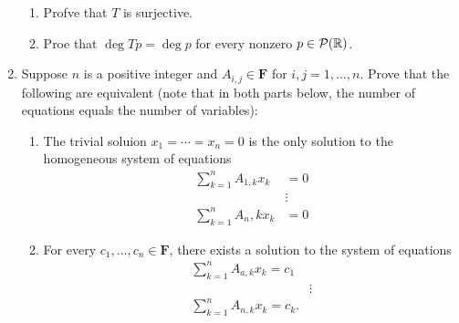 \documentclass[10pt,a4paper]{report}
\newcommand{\F}{\textbf{F}}
\begin{document}
\begin{enumerate}
\begin{enumerate}
	\item Profve that $T$ is surjective.
	\item Proe that $\deg Tp = \deg p$ for every nonzero $p \in \mathcal{P}(\mathbb{R})$.
\end{enumerate}

\item Suppose $n$ is a positive integer and $A_{i,j} \in \F$ for $i,j = 1,\dots,n$.  Prove that the following are equivalent (note that in both parts below, the number of equations equals the number of variables):

\begin{enumerate}
\item The trivial soluion $x_1=\cdots=x_n=0$ is the only solution to the homogeneous system of equations
\begin{align*}
	\sum_{k=1}^n A_{1,k} x_k &= 0\\
	&\vdots \\
	\sum_{k=1}^n A_n,k x_k &= 0
\end{align*}

\item For every $c_1,\dots,c_n \in \F$, there exists a solution to the system of equations 
\begin{align*}
	\sum_{k=1}^n A_{a,k} x_k = c_1 \\
	&\vdots \\
	\sum_{k=1}^n A_{n,k} x_k = c_k.
\end{align*}
\end{enumerate}

\end{enumerate}
\end{document}
